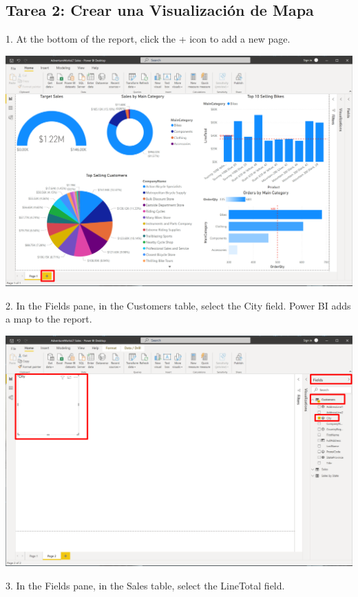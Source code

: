 \documentclass[12pt,letterpaper]{article}
\begin{document}
\subsection*{Tarea 2: Crear una Visualización de Mapa}
1. At the bottom of the report, click the + icon to add a new page.
\begin{center}
    \includegraphics[width=15cm]{img/101.png}
\end{center}
2. In the Fields pane, in the Customers table, select the City field. Power BI adds a map to the report.
\begin{center}
    \includegraphics[width=16cm]{img/102.png}
\end{center}
3. In the Fields pane, in the Sales table, select the LineTotal field.
\end{document}
